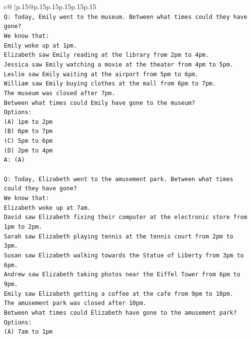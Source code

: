 \documentclass{article}
\begin{document}
{\begin{supertabular}{c@{$\;$}|p{.15\linewidth}@{}p{.15\linewidth}p{.15\linewidth}p{.15\linewidth}p{.15\linewidth}p{.15\linewidth}}
{{{\\ 
\texttt{Q: Today, Emily went to the museum. Between what times could they have gone?} \\
\texttt{We know that:} \\
\texttt{Emily woke up at 1pm.} \\
\texttt{Elizabeth saw Emily reading at the library from 2pm to 4pm.} \\
\texttt{Jessica saw Emily watching a movie at the theater from 4pm to 5pm.} \\
\texttt{Leslie saw Emily waiting at the airport from 5pm to 6pm.} \\
\texttt{William saw Emily buying clothes at the mall from 6pm to 7pm.} \\
\texttt{The museum was closed after 7pm.} \\
\texttt{Between what times could Emily have gone to the museum?} \\
\texttt{Options:} \\
\texttt{(A) 1pm to 2pm} \\
\texttt{(B) 6pm to 7pm} \\
\texttt{(C) 5pm to 6pm} \\
\texttt{(D) 2pm to 4pm} \\
\texttt{A: (A)} \\
\\ 
\texttt{Q: Today, Elizabeth went to the amusement park. Between what times could they have gone?} \\
\texttt{We know that:} \\
\texttt{Elizabeth woke up at 7am.} \\
\texttt{David saw Elizabeth fixing their computer at the electronic store from 1pm to 2pm.} \\
\texttt{Sarah saw Elizabeth playing tennis at the tennis court from 2pm to 3pm.} \\
\texttt{Susan saw Elizabeth walking towards the Statue of Liberty from 3pm to 6pm.} \\
\texttt{Andrew saw Elizabeth taking photos near the Eiffel Tower from 6pm to 9pm.} \\
\texttt{Emily saw Elizabeth getting a coffee at the cafe from 9pm to 10pm.} \\
\texttt{The amusement park was closed after 10pm.} \\
\texttt{Between what times could Elizabeth have gone to the amusement park?} \\
\texttt{Options:} \\
\texttt{(A) 7am to 1pm} \\
}}}
\end{supertabular}}
\end{document}
